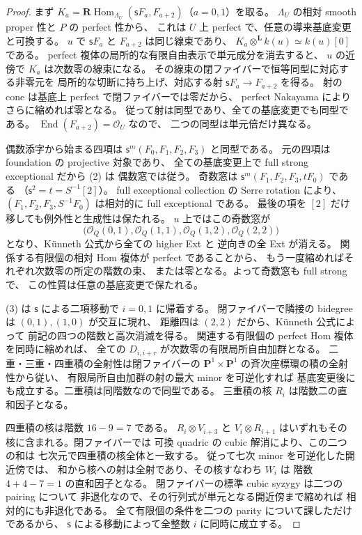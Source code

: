 \begin{proof}
まず $K_a=\mathbf R\operatorname{Hom}_{\Lambda_U}
       (\mathsf sF_a,F_{a+2})$（$a=0,1$）を取る。
$\Lambda_U$ の相対 smooth proper 性と $P$ の perfect 性から、
これは $U$ 上 perfect で、任意の導来基底変更と可換する。
$u$ で $\mathsf sF_a$ と $F_{a+2}$ は同じ線束であり、
$K_a\otimes^{\mathbf L}k(u)\simeq k(u)[0]$ である。
perfect 複体の局所的な有限自由表示で単元成分を消去すると、
$u$ の近傍で $K_a$ は次数零の線束になる。
その線束の閉ファイバーで恒等同型に対応する非零元を
局所的な切断に持ち上げ、対応する射
$\mathsf sF_a\to F_{a+2}$ を得る。
射の cone は基底上 perfect で閉ファイバーでは零だから、
perfect Nakayama によりさらに縮めれば零となる。
従って射は同型であり、全ての基底変更でも同型である。
$\operatorname{End}(F_{a+2})=\mathcal O_U$ なので、
二つの同型は単元倍だけ異なる。

偶数添字から始まる四項は
$\mathsf s^m(F_0,F_1,F_2,F_3)$ と同型である。
元の四項は foundation の projective 対象であり、
全ての基底変更上で full strong exceptional だから (2) は
偶数窓では従う。
奇数窓は $\mathsf s^m(F_1,F_2,F_3,tF_0)$ である
（$\mathsf s^2=t=S^{-1}[2]$）。
full exceptional collection の Serre rotation により、
$(F_1,F_2,F_3,S^{-1}F_0)$ は相対的に full exceptional である。
最後の項を $[2]$ だけ移しても例外性と生成性は保たれる。
$u$ 上ではこの奇数窓が
\[
  \bigl(\mathcal O_Q(0,1),\mathcal O_Q(1,1),
        \mathcal O_Q(1,2),\mathcal O_Q(2,2)\bigr)
\]
となり、K\"unneth 公式から全ての higher Ext と
逆向きの全 Ext が消える。
関係する有限個の相対 Hom 複体が perfect であることから、
もう一度縮めればそれぞれ次数零の所定の階数の束、
または零となる。よって奇数窓も full strong で、
この性質は任意の基底変更で保たれる。

(3) は $\mathsf s$ による二項移動で $i=0,1$ に帰着する。
閉ファイバーで隣接の bidegree は $(0,1),(1,0)$ が交互に現れ、
距離四は $(2,2)$ だから、K\"unneth 公式によって
前記の四つの階数と高次消滅を得る。
関連する有限個の perfect Hom 複体を同時に縮めれば、
全ての $D_{i,i+r}$ が次数零の有限局所自由加群となる。
二重・三重・四重積の全射性は閉ファイバーの
$\mathbf P^1\times\mathbf P^1$ の斉次座標環の積の全射性から従い、
有限局所自由加群の射の最大 minor を可逆化すれば
基底変更後にも成立する。二重積は同階数なので同型である。
三重積の核 $R_i$ は階数二の直和因子となる。

四重積の核は階数 $16-9=7$ である。
$R_i\otimes V_{i+3}$ と $V_i\otimes R_{i+1}$
はいずれもその核に含まれる。閉ファイバーでは
可換 quadric の cubic 解消により、この二つの和は
七次元で四重積の核全体と一致する。
従って七次 minor を可逆化した開近傍では、
和から核への射は全射であり、その核すなわち $W_i$ は
階数 $4+4-7=1$ の直和因子となる。
閉ファイバーの標準 cubic syzygy は二つの pairing について
非退化なので、その行列式が単元となる開近傍まで縮めれば
相対的にも非退化である。
全て有限個の条件を二つの parity について課しただけであるから、
$\mathsf s$ による移動によって全整数 $i$ に同時に成立する。
\end{proof}


